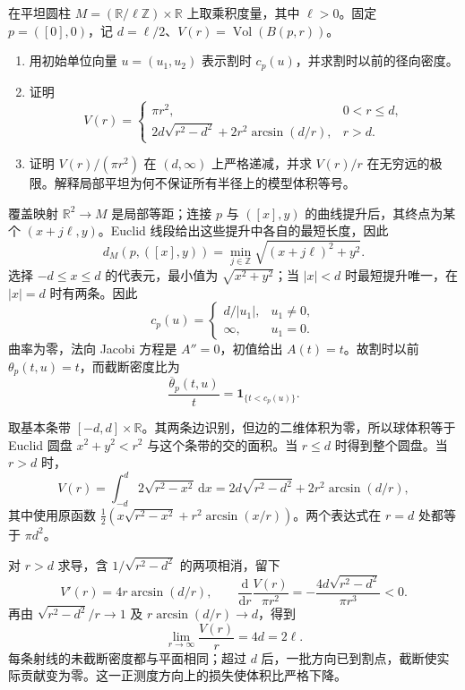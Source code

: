 \begin{exercise}\label{g3:ex:flat-cylinder-ball-volume}
	在平坦圆柱 \(M=(\mathbb R/\ell\mathbb Z)\times\mathbb R\) 上取乘积度量，其中 \(\ell>0\)。固定 \(p=([0],0)\)，记 \(d=\ell/2\)、\(V(r)=\operatorname{Vol}(B(p,r))\)。
	\begin{enumerate}
		\item 用初始单位向量 \(u=(u_1,u_2)\) 表示割时 \(c_p(u)\)，并求割时以前的径向密度。
		\item 证明
		\[
			V(r)=
			\begin{cases}
				\pi r^2,&0<r\le d,\\
				2d\sqrt{r^2-d^2}+2r^2\arcsin(d/r),&r>d.
			\end{cases}
		\]
		\item 证明 \(V(r)/(\pi r^2)\) 在 \((d,\infty)\) 上严格递减，并求 \(V(r)/r\) 在无穷远的极限。解释局部平坦为何不保证所有半径上的模型体积等号。
	\end{enumerate}
\end{exercise}
\begin{solution}
	覆盖映射 \(\mathbb R^2\to M\) 是局部等距；连接 \(p\) 与 \(([x],y)\) 的曲线提升后，其终点为某个 \((x+j\ell,y)\)。Euclid 线段给出这些提升中各自的最短长度，因此
	\[
		d_M(p,([x],y))=\min_{j\in\mathbb Z}\sqrt{(x+j\ell)^2+y^2}.
	\]
	选择 \(-d\le x\le d\) 的代表元，最小值为 \(\sqrt{x^2+y^2}\)；当 \(|x|<d\) 时最短提升唯一，在 \(|x|=d\) 时有两条。因此
	\[
		c_p(u)=
		\begin{cases}d/|u_1|,&u_1\ne0,\\ \infty,&u_1=0.\end{cases}
	\]
	曲率为零，法向 Jacobi 方程是 \(A''=0\)，初值给出 \(A(t)=t\)。故割时以前 \(\theta_p(t,u)=t\)，而截断密度比为
	\[
		\frac{\overline\theta_p(t,u)}t=\mathbf1_{\{t<c_p(u)\}}.
	\]

	取基本条带 \([-d,d]\times\mathbb R\)。其两条边识别，但边的二维体积为零，所以球体积等于 Euclid 圆盘 \(x^2+y^2<r^2\) 与这个条带的交的面积。当 \(r\le d\) 时得到整个圆盘。当 \(r>d\) 时，
	\[
		V(r)=\int_{-d}^d2\sqrt{r^2-x^2}\,\mathrm dx
		=2d\sqrt{r^2-d^2}+2r^2\arcsin(d/r),
	\]
	其中使用原函数
	\(\frac12(x\sqrt{r^2-x^2}+r^2\arcsin(x/r))\)。两个表达式在 \(r=d\) 处都等于 \(\pi d^2\)。

	对 \(r>d\) 求导，含 \(1/\sqrt{r^2-d^2}\) 的两项相消，留下
	\[
		V'(r)=4r\arcsin(d/r),\qquad
		\frac{\mathrm d}{\mathrm dr}\frac{V(r)}{\pi r^2}
		=-\frac{4d\sqrt{r^2-d^2}}{\pi r^3}<0.
	\]
	再由 \(\sqrt{r^2-d^2}/r\to1\) 及 \(r\arcsin(d/r)\to d\)，得到
	\[
		\lim_{r\to\infty}\frac{V(r)}r=4d=2\ell.
	\]
	每条射线的未截断密度都与平面相同；超过 \(d\) 后，一批方向已到割点，截断使实际贡献变为零。这一正测度方向上的损失使体积比严格下降。
\end{solution}

